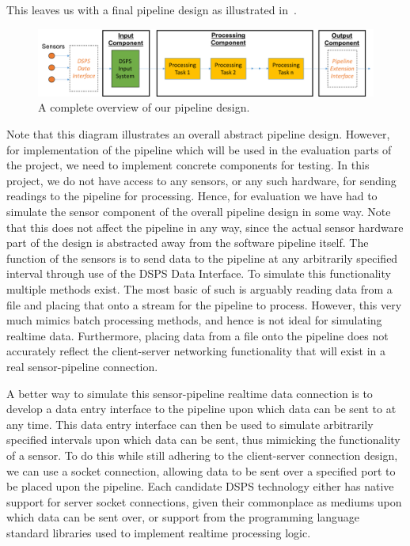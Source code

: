This leaves us with a final pipeline design as illustrated in~.

\begin{figure}[ht]
  \centering
  \includegraphics[width=1\textwidth]{includes/figures/fig_pipeline_whole}
  \caption{A complete overview of our pipeline design.}
  \label{fig:pipeline_whole}
\end{figure}

Note that this diagram illustrates an overall abstract pipeline design. However, for implementation of the pipeline which
will be used in the evaluation parts of the project, we need to implement concrete components for testing. In this project,
we do not have access to any sensors, or any such hardware, for sending readings to the pipeline for processing. Hence, for evaluation
we have had to simulate the sensor component of the overall pipeline design in some way. Note that this does not affect
the pipeline in any way, since the actual sensor hardware part of the design is abstracted away from the software pipeline
itself. The function of the sensors is to send data to the pipeline at any arbitrarily specified interval through use of the
DSPS Data Interface.
To simulate this functionality multiple methods exist. The most basic of such is arguably reading data from a file
and placing that onto a stream for the pipeline to process. However, this very much mimics batch processing methods, and
hence is not ideal for simulating realtime data. Furthermore, placing data from a file onto the pipeline does not accurately
reflect the client-server networking functionality that will exist in a real sensor-pipeline connection.

A better way to simulate this sensor-pipeline realtime data connection is to develop a data entry interface to the pipeline upon which data can be sent to
at any time. This data entry interface can then be used to simulate arbitrarily specified intervals upon which data can be sent,
thus mimicking the functionality of a sensor. To do this while still adhering to the client-server connection design,
we can use a socket connection, allowing data to be sent over a specified port to be placed upon the pipeline. Each
candidate DSPS technology either has native support for server socket connections, given their commonplace as mediums upon
which data can be sent over, or support from the programming language standard libraries used to implement realtime processing logic.

